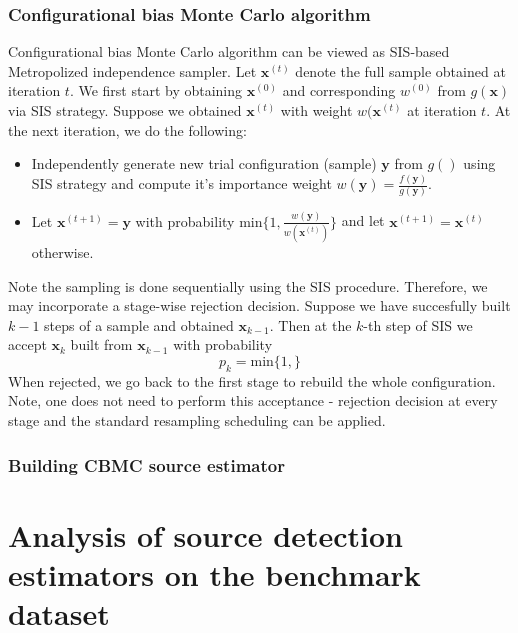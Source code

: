 \documentclass[times, utf8, diplomski]{fer}
\begin{document}
\subsection{Configurational bias Monte Carlo algorithm}
Configurational bias Monte Carlo algorithm can be viewed as SIS-based Metropolized independence sampler. Let $\mathbf{x} ^{(t)}$ denote the full sample obtained at iteration $t$. We first start by obtaining $\mathbf{x}^{(0)}$  and corresponding $w^{(0)}$ from $g(\mathbf{x})$ via SIS strategy. Suppose we obtained $\mathbf{x}^{(t)}$ with weight $w(\mathbf{x}^{(t)}$ at iteration $t$. At the next iteration, we do the following:
\begin{itemize}
\item{Independently generate new trial configuration (sample) $\mathbf{y}$ from $g()$ using SIS strategy and compute it's importance weight $w(\mathbf{y}) = \frac{f(\mathbf{y})}{g(\mathbf{y})}$.}
\item{Let $\mathbf{x}^{(t + 1)} = \mathbf{y}$ with probability $\text{min}\big\{1, \frac{w(\mathbf{y})}{w(\mathbf{x}^{(t)})} \big\}$} and let $\mathbf{x}^{(t + 1)} = \mathbf{x}^{(t)}$ otherwise.
\end{itemize}
\vspace{3mm}

Note the sampling is done sequentially using the SIS procedure. Therefore, we may incorporate a stage-wise rejection decision.  Suppose we have succesfully built $k - 1$ steps of a sample and obtained $\mathbf{x}_{k - 1}$. Then at the $k$-th step of SIS we accept $\mathbf{x}_{k}$ built from $\mathbf{x}_{k - 1}$ with probability
\begin{equation} 
p_k = \text{min} \big \{1, \big \}
\end{equation}
When rejected, we go back to the first stage to rebuild the whole configuration. Note, one does not need to perform this acceptance - rejection decision at every stage and the standard  resampling scheduling can be applied.

\subsection{Building CBMC source estimator}

\chapter{Analysis of source detection estimators on the benchmark dataset}
\label{Bench}
\end{document}
